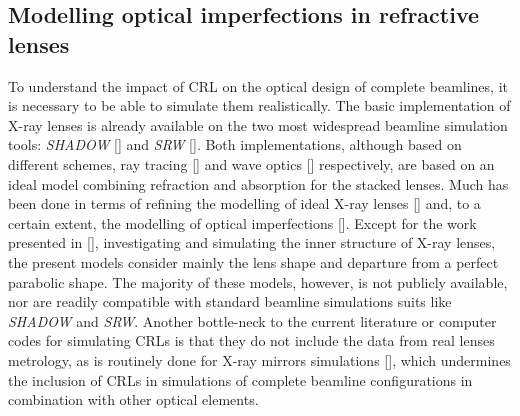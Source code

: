 \begin{refsection}
\chapter{Modelling optical imperfections in refractive lenses}\label{sec:modelling}

To understand the impact of CRL on the optical design of complete beamlines, it is necessary to be able to simulate them realistically. The basic implementation of X-ray lenses is already available on the two most widespread beamline simulation tools: \textit{SHADOW} [\cite{SanchezdelRio2011}] and \textit{SRW} [\cite{Chubar1998}]. Both implementations, although based on different schemes, ray tracing [\cite{Alianelli2007}] and wave optics [\cite{Baltser2011}] respectively, are based on an ideal model combining refraction and absorption for the stacked lenses. Much has been done in terms of refining the modelling of ideal X-ray lenses [\cite{Umbach2008, SanchezdelRio2012, Osterhoff2013, Simons2017, Pedersen2018}] and, to a certain extent, the modelling of optical imperfections [\cite{Pantell2001, Andrejczuk2010, Gasilov2017, Osterhoff2017}]. Except for the work presented in [\cite{Roth2014}], investigating and simulating the inner structure of X-ray lenses, the present models consider mainly the lens shape and departure from a perfect parabolic shape. The majority of these models, however, is not publicly available, nor are readily compatible with standard beamline simulations suits like \textit{SHADOW} and \textit{SRW}. Another bottle-neck to the current literature or computer codes for simulating CRLs is that they do not include the data from real lenses metrology, as is routinely done for X-ray mirrors simulations [\cite{SanchezDelRio2016}], which undermines the inclusion of CRLs in simulations of complete beamline configurations in combination with other optical elements.


\end{refsection}
